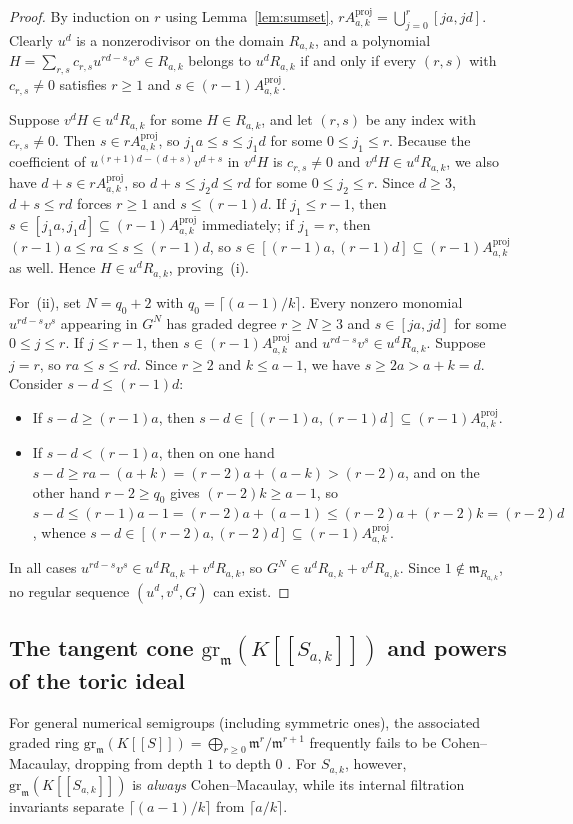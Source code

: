 \documentclass[11pt]{amsart}
\theoremstyle{definition}
\theoremstyle{remark}
\newcommand{\mm}{\mathfrak{m}}
\newcommand{\gr}{\mathrm{gr}}
\begin{document}
\begin{proof}
By induction on $r$ using Lemma~\ref{lem:sumset}, $r A^{\mathrm{proj}}_{a,k} = \bigcup_{j=0}^r [ja, jd]$. Clearly $u^d$ is a nonzerodivisor on the domain $R_{a,k}$, and a polynomial $H = \sum_{r,s} c_{r,s} u^{rd-s} v^s \in R_{a,k}$ belongs to $u^d R_{a,k}$ if and only if every $(r,s)$ with $c_{r,s} \ne 0$ satisfies $r \ge 1$ and $s \in (r-1) A^{\mathrm{proj}}_{a,k}$.

Suppose $v^d H \in u^d R_{a,k}$ for some $H \in R_{a,k}$, and let $(r,s)$ be any index with $c_{r,s} \ne 0$. Then $s \in r A^{\mathrm{proj}}_{a,k}$, so $j_1 a \le s \le j_1 d$ for some $0 \le j_1 \le r$. Because the coefficient of $u^{(r+1)d - (d+s)} v^{d+s}$ in $v^d H$ is $c_{r,s} \ne 0$ and $v^d H \in u^d R_{a,k}$, we also have $d + s \in r A^{\mathrm{proj}}_{a,k}$, so $d + s \le j_2 d \le rd$ for some $0 \le j_2 \le r$. Since $d \ge 3$, $d + s \le rd$ forces $r \ge 1$ and $s \le (r - 1)d$. If $j_1 \le r - 1$, then $s \in [j_1 a, j_1 d] \subseteq (r-1) A^{\mathrm{proj}}_{a,k}$ immediately; if $j_1 = r$, then $(r-1)a \le ra \le s \le (r-1)d$, so $s \in [(r-1)a, (r-1)d] \subseteq (r-1) A^{\mathrm{proj}}_{a,k}$ as well. Hence $H \in u^d R_{a,k}$, proving~(i).

For~(ii), set $N = q_0 + 2$ with $q_0 = \lceil (a-1)/k \rceil$. Every nonzero monomial $u^{rd-s} v^s$ appearing in $G^N$ has graded degree $r \ge N \ge 3$ and $s \in [ja, jd]$ for some $0 \le j \le r$. If $j \le r - 1$, then $s \in (r-1) A^{\mathrm{proj}}_{a,k}$ and $u^{rd-s} v^s \in u^d R_{a,k}$. Suppose $j = r$, so $ra \le s \le rd$. Since $r \ge 2$ and $k \le a - 1$, we have $s \ge 2a > a + k = d$. Consider $s - d \le (r-1)d$:
\begin{itemize}
  \item If $s - d \ge (r-1)a$, then $s - d \in [(r-1)a, (r-1)d] \subseteq (r-1) A^{\mathrm{proj}}_{a,k}$.
  \item If $s - d < (r-1)a$, then on one hand $s - d \ge ra - (a+k) = (r-2)a + (a-k) > (r-2)a$, and on the other hand $r - 2 \ge q_0$ gives $(r-2)k \ge a - 1$, so $s - d \le (r-1)a - 1 = (r-2)a + (a - 1) \le (r-2)a + (r-2)k = (r-2)d$, whence $s - d \in [(r-2)a, (r-2)d] \subseteq (r-1) A^{\mathrm{proj}}_{a,k}$.
\end{itemize}
In all cases $u^{rd-s} v^s \in u^d R_{a,k} + v^d R_{a,k}$, so $G^N \in u^d R_{a,k} + v^d R_{a,k}$. Since $1 \notin \mm_{R_{a,k}}$, no regular sequence $(u^d, v^d, G)$ can exist.
\end{proof}

\subsection{The tangent cone \texorpdfstring{$\gr_{\mm}(K[[S_{a,k}]])$}{gr\_m(K[[S\_\{a,k\}]])} and powers of the toric ideal}
For general numerical semigroups (including symmetric ones), the associated graded ring $\gr_{\mm}(K[[S]]) = \bigoplus_{r \ge 0} \mm^r / \mm^{r+1}$ frequently fails to be Cohen--Macaulay, dropping from depth $1$ to depth $0$ \cite{GarciaSanchezOjeda2010}. For $S_{a,k}$, however, $\gr_{\mm}(K[[S_{a,k}]])$ is \emph{always} Cohen--Macaulay, while its internal filtration invariants separate $\lceil (a-1)/k \rceil$ from $\lceil a/k \rceil$.
\end{document}
